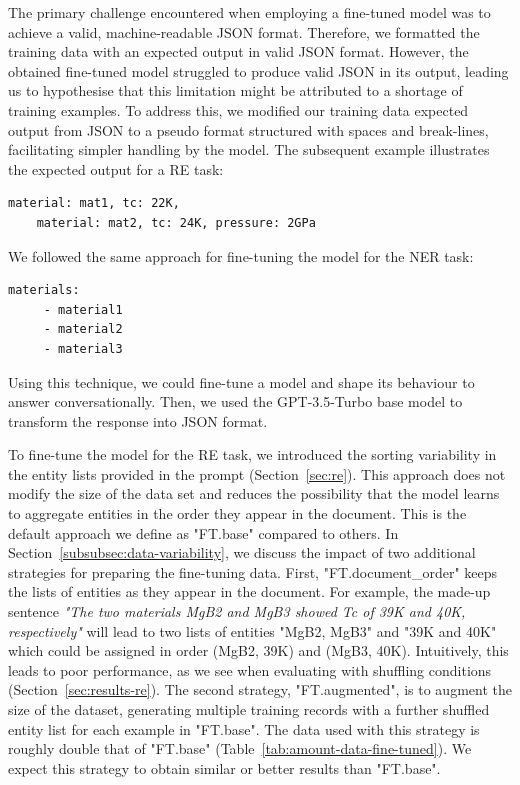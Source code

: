 The primary challenge encountered when employing a fine-tuned model was to achieve a valid, machine-readable JSON format. 
Therefore, we formatted the training data with an expected output in valid JSON format. 
However, the obtained fine-tuned model struggled to produce valid JSON in its output, leading us to hypothesise that this limitation might be attributed to a shortage of training examples. 
To address this, we modified our training data expected output from JSON to a pseudo format structured with spaces and break-lines, facilitating simpler handling by the model. The subsequent example illustrates the expected output for a RE task:

\begin{lstlisting}[caption=Example format of the expected answer for the RE task]
    material: mat1, tc: 22K, 
    material: mat2, tc: 24K, pressure: 2GPa
\end{lstlisting}

We followed the same approach for fine-tuning the model for the NER task: 

\begin{lstlisting}[caption=Example format of the expected answer for the NER task]
    materials: 
     - material1
     - material2
     - material3
\end{lstlisting}

Using this technique, we could fine-tune a model and shape its behaviour to answer conversationally. Then, we used the GPT-3.5-Turbo base model to transform the response into JSON format. 

To fine-tune the model for the RE task, we introduced the sorting variability in the entity lists provided in the prompt (Section~\ref{sec:re}). This approach does not modify the size of the data set and reduces the possibility that the model learns to aggregate entities in the order they appear in the document. This is the default approach we define as "FT.base" compared to others.
In Section~\ref{subsubsec:data-variability}, we discuss the impact of two additional strategies for preparing the fine-tuning data. 
First, "FT.document\_order" keeps the lists of entities as they appear in the document. 
For example, the made-up sentence \textit{"The two materials MgB2 and MgB3 showed Tc of 39K and 40K, respectively"} will lead to two lists of entities "MgB2, MgB3" and "39K and 40K" which could be assigned in order (MgB2, 39K) and (MgB3, 40K).
Intuitively, this leads to poor performance, as we see when evaluating with shuffling conditions (Section~\ref{sec:results-re}). 
The second strategy, "FT.augmented", is to augment the size of the dataset, generating multiple training records with a further shuffled entity list for each example in "FT.base". The data used with this strategy is roughly double that of "FT.base" (Table~\ref{tab:amount-data-fine-tuned}). We expect this strategy to obtain similar or better results than "FT.base". 

